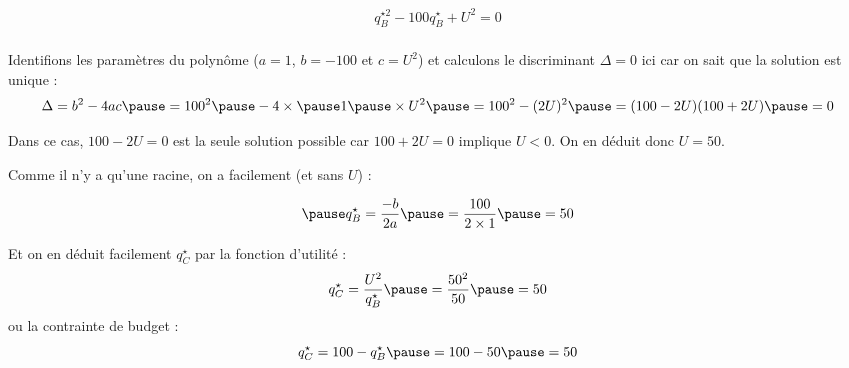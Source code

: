 \documentclass[9pt,professionalfonts,handout,hyperref]{beamer}
\begin{document}
\begin{frame}
	
\[\begin{aligned}
q_B^{\star 2} -100q_B^\star + U^2 = 0\\
\end{aligned}\]
		
\pause Identifions les paramètres du polynôme \pause ($a=1$, \pause $b=-100$ \pause et $c=U^2$) \pause et calculons le discriminant $\Delta =0$ ici car on sait que la solution est unique :	
\[
\Delta = b^2 -4ac \pause = 100^2 \pause - 4 \times \pause 1 \pause \times U^2 \pause = 100^2 - (2U)^2 \pause = (100- 2U)(100+ 2U) \pause = 0
\]

\pause Dans ce cas, $100- 2U = 0$ est la seule solution possible car $100+ 2U = 0$ implique $U<0$. \pause On en déduit donc $U = 50$. \newline 

\pause Comme il n'y a qu'une racine, on a facilement (et sans $U$) : 

\[\begin{aligned}
\pause &q_B^\star = \frac{-b}{2a} \pause = \frac{100}{2\times1} \pause = 50\\
\end{aligned}\]
	
\pause Et on en déduit facilement $q_C^\star$ \pause par la fonction d'utilité : \pause $$q_C^\star= \frac{U^2}{q_B^\star} \pause = \frac{50^2}{50} \pause = 50$$ \pause ou la contrainte de budget : 
$$q_C^\star = 100-q_B^\star \pause = 100-50 \pause = 50$$
 	
\end{frame}
\end{document}
